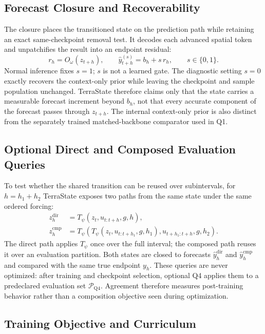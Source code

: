 \documentclass[letterpaper]{article} %
\begin{document}
\subsection{Forecast Closure and Recoverability}

The closure places the transitioned state on the prediction path while retaining
an exact same-checkpoint removal test. It decodes each advanced spatial token
and unpatchifies the result into an endpoint residual:
\begin{equation}
r_h=O_\omega(z_{t+h}),\qquad
\widehat y_{t+h}^{(s)}=b_h+s\,r_h,\qquad s\in\{0,1\}.
\label{eq:closure}
\end{equation}
Normal inference fixes $s=1$; $s$ is not a learned gate. The diagnostic setting
$s=0$ exactly recovers the context-only prior while leaving the checkpoint and
sample population unchanged. TerraState therefore claims only that the state
carries a measurable forecast increment beyond $b_h$, not that every accurate
component of the forecast passes through $z_{t+h}$. The internal context-only
prior is also distinct from the separately trained matched-backbone comparator
used in Q1.

\subsection{Optional Direct and Composed Evaluation Queries}

To test whether the shared transition can be reused over subintervals, for
$h=h_1+h_2$ TerraState exposes two paths from the same state under the same
ordered forcing:
\begin{align}
z_h^{\mathrm{dir}}
&=T_\psi(z_t,u_{t:t+h},g,h), \label{eq:direct}\\
z_h^{\mathrm{cmp}}
&=T_\psi\!\left(
T_\psi(z_t,u_{t:t+h_1},g,h_1),
u_{t+h_1:t+h},g,h_2\right).
\label{eq:composed}
\end{align}
The direct path applies $T_\psi$ once over the full interval; the composed path
reuses it over an evaluation partition. Both states are closed to forecasts
$\widehat y_h^{\mathrm{dir}}$ and $\widehat y_h^{\mathrm{cmp}}$ and compared
with the same true endpoint $y_h$. These queries are never optimized: after
training and checkpoint selection, optional Q4 applies them to a predeclared
evaluation set $\mathcal P_{\mathrm{Q4}}$. Agreement therefore measures
post-training behavior rather than a composition objective seen during
optimization.

\subsection{Training Objective and Curriculum}
\end{document}
